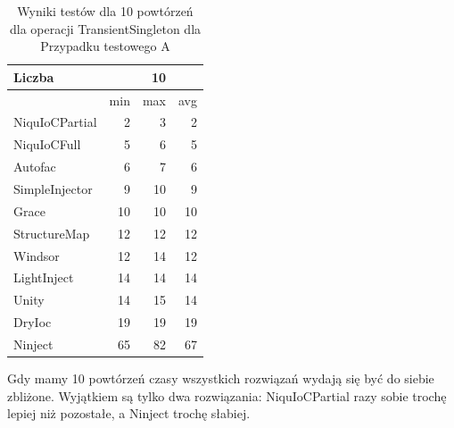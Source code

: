 \documentclass[12pt]{article}
\begin{document}
\begin{table}[H]
\captionsetup{belowskip=0pt,aboveskip=0pt}
\begin{center}
\begin{small}
	\begin{tabular}{ | l | r r r | }
    		\hline
Liczba & & 10 & \\ \hline
 & min & max & avg \\ \hline
NiquIoCPartial & 2 & 3 & 2 \\ \hline
NiquIoCFull & 5 & 6 & 5 \\ \hline
Autofac & 6 & 7 & 6 \\ \hline
SimpleInjector & 9 & 10 & 9 \\ \hline
Grace & 10 & 10 & 10 \\ \hline
StructureMap & 12 & 12 & 12 \\ \hline
Windsor & 12 & 14 & 12 \\ \hline
LightInject & 14 & 14 & 14 \\ \hline
Unity & 14 & 15 & 14 \\ \hline
DryIoc & 19 & 19 & 19 \\ \hline
Ninject & 65 & 82 & 67 \\ \hline
  	\end{tabular}
\end{small}
\end{center}
\caption{Wyniki testów dla 10 powtórzeń dla operacji TransientSingleton dla Przypadku testowego A}
\label{TestCaseA_TransientSingleton10}
\end{table}
Gdy mamy 10 powtórzeń czasy wszystkich rozwiązań wydają się być do siebie zbliżone. Wyjątkiem są tylko dwa rozwiązania: NiquIoCPartial razy sobie trochę lepiej niż pozostałe, a Ninject trochę słabiej.
\\ \\
\end{document}
